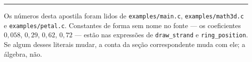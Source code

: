\documentclass[11pt,a4paper]{article}
\newcommand{\fn}[1]{\texttt{\nobreak\hspace{0pt}#1}}
\begin{document}
\vspace{1.2em}
{\color{linhasuave}\rule{\textwidth}{0.6pt}}
\vspace{0.6em}
{\sffamily\footnotesize\color{muted}
Os números desta apostila foram lidos de \fn{examples/main.c}, \fn{examples/math3d.c} e \fn{examples/petal.c}. Constantes de forma sem nome no fonte --- os coeficientes \(0{,}058\), \(0{,}29\), \(0{,}62\), \(0{,}72\) --- estão nas expressões de \fn{draw\_strand} e \fn{ring\_position}. Se algum desses literais mudar, a conta da seção correspondente muda com ele; a álgebra, não.
\par}
\end{document}
